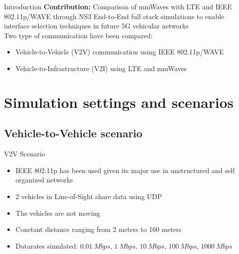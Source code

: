 \documentclass{beamer}
\begin{document}
	\begin{frame}{Introduction}
		\textbf{Contribution:} Comparison of mmWaves with LTE and IEEE 802.11p/WAVE through NS3 End-to-End full stack simulations to enable interface selection techniques in future 5G vehicular networks\\ \vspace{1cm}
		Two type of communication have been compared: \vspace{.5em}
		\begin{itemize}
			\item Vehicle-to-Vehicle (V2V) communication using IEEE 802.11p/WAVE\vspace{.5em}
			\item Vehicle-to-Infrastructure (V2I) using LTE and mmWaves \vspace{.5em}
		\end{itemize}
	\end{frame}

	\section{Simulation settings and scenarios}

	\subsection{Vehicle-to-Vehicle scenario}

	\begin{frame}{V2V Scenario}
		\begin{itemize}
			\item IEEE 802.11p has been used given its major use in unstructured and self organized networks
			\item 2 vehicles in Line-of-Sight share data using UDP\vspace{.5em}
			\item The vehicles are not moving
			\item Constant distance ranging from 2 meters to 160 meters\vspace{.5em}
			\item Datarates simulated:  $0.01 ~Mbps$, $1 ~Mbps$, $10 ~Mbps$, $100 ~Mbps$, $1000 ~Mbps$
		\end{itemize}
	\end{frame}

\end{document}

